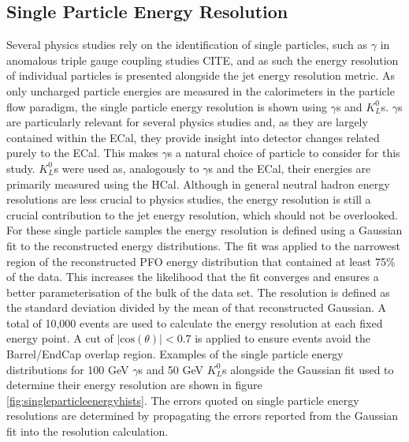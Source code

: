 \subsection{Single Particle Energy Resolution}
Several physics studies rely on the identification of single particles, such as $\gamma$ in anomalous triple gauge coupling studies CITE, and as such the energy resolution of individual particles is presented alongside the jet energy resolution metric.  As only uncharged particle energies are measured in the calorimeters in the particle flow paradigm, the single particle energy resolution is shown using $\gamma$s and $K^{0}_{L}$s.  $\gamma$s are particularly relevant for several physics studies and, as they are largely contained within the ECal, they provide insight into detector changes related purely to the ECal.  This makes $\gamma$s a natural choice of particle to consider for this study.  $K^{0}_{L}$s were used as, analogously to $\gamma$s and the ECal, their energies are primarily measured using the HCal.  Although in general neutral hadron energy resolutions are less crucial to physics studies, the energy resolution is still a crucial contribution to the jet energy resolution, which should not be overlooked.  For these single particle samples the energy resolution is defined using a Gaussian fit to the reconstructed energy distributions.  The fit was applied to the narrowest region of the reconstructed PFO energy distribution that contained at least 75\% of the data.  This increases the likelihood that the fit converges and ensures a better parameterisation of the bulk of the data set.  The resolution is defined as the standard deviation divided by the mean of that reconstructed Gaussian.  A total of 10,000 events are used to calculate the energy resolution at each fixed energy point.  A cut of $|\text{cos}(\theta)| < 0.7$ is applied to ensure events avoid the Barrel/EndCap overlap region.  Examples of the single particle energy distributions for 100 GeV $\gamma$s and 50 GeV $K^{0}_{L}$s alongside the Gaussian fit used to determine their energy resolution are shown in figure \ref{fig:singleparticleenergyhists}.  The errors quoted on single particle energy resolutions are determined by propagating the errors reported from the Gaussian fit into the resolution calculation.  

